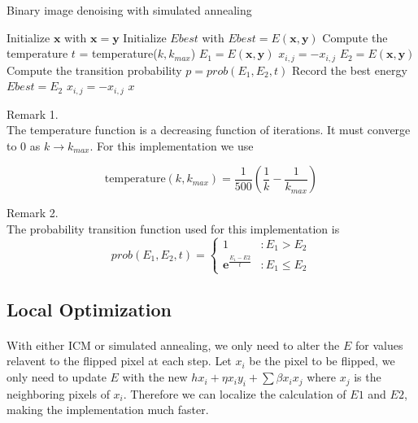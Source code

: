 \documentclass{article}
\begin{document}
\begin{algorithm}
\centering
\caption{Binary image denoising with simulated annealing}
\label{alg:sa}
  \begin{algorithmic}[1]
        \State Initialize $\mathbf{x}$ with $\mathbf{x} = \mathbf{y}$
        \State Initialize $Ebest$ with $Ebest = E(\mathbf{x}, \mathbf{y})$
	    	\State Compute the temperature $t$ = temperature($k,k_{max}$)
	    		\State $E_1 = E(\mathbf{x}, \mathbf{y})$
	    		\State $x_{i,j} = - x_{i,j}$ 
	    		\State $E_2 = E(\mathbf{x}, \mathbf{y})$
	    		\State Compute the transition probability $p = prob(E_1, E_2, t)$
		    			\State Record the best energy $Ebest = E_2$
		    		\EndIf
		    	\Else
		    		\State $x_{i,j} = - x_{i,j}$ 
		    	\EndIf
	    	\EndFor
	    \EndFor
      \Return $x$
    \EndFunction
  \end{algorithmic}
\end{algorithm}

\begin{description}
\item Remark 1.\hfill \\
The temperature function is a decreasing function of iterations. It must converge to $0$ as $k \to k_{max}$. For this implementation we use

$$
\text{temperature}(k, k_{max}) = \frac{1}{500}(\frac{1}{k} - \frac{1}{k_{max}})
$$
\item Remark 2.\hfill \\
The probability transition function used for this implementation is
$$
prob(E_1, E_2, t) =  \left\{
     \begin{array}{lr}
       1 & : E_1 > E_2 \\
       \mathbf{e}^{\frac{E_1 - E2}{t}} & : E_1 \leq E_2
     \end{array}
   \right.
$$
\end{description}

\subsection{Local Optimization}

\paragraph{}
With either ICM or simulated annealing, we only need to alter the $E$ for values relavent to the flipped pixel at each step. Let $x_i$ be the pixel to be flipped, we only need to update $E$ with the new $hx_i + \eta x_i y_i + \sum \beta x_i x_j$ where $x_j$ is the neighboring pixels of $x_i$. Therefore we can localize the calculation of $E1$ and $E2$, making the implementation much faster.
\end{document}
